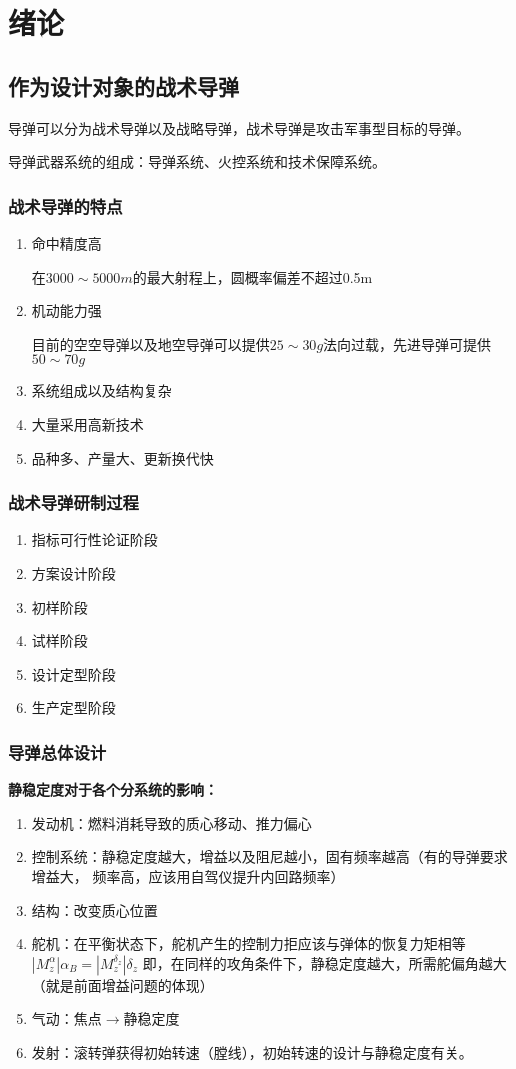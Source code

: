 \chapter{绪论}
\section{作为设计对象的战术导弹}

导弹可以分为战术导弹以及战略导弹，战术导弹是攻击军事型目标的导弹。

导弹武器系统的组成：导弹系统、火控系统和技术保障系统。
\subsection{战术导弹的特点}
\begin{enumerate}[1)]
    \item 命中精度高
    
    {\kaishu 在$3000\sim5000m$的最大射程上，圆概率偏差不超过0.5m}
    \item 机动能力强
    
    {\kaishu 目前的空空导弹以及地空导弹可以提供$25\sim30g$法向过载，先进导弹可提供$50\sim70g$}
    \item 系统组成以及结构复杂
    \item 大量采用高新技术
    \item 品种多、产量大、更新换代快
\end{enumerate}
\subsection{战术导弹研制过程}
\begin{enumerate}[1)]
    \item 指标可行性论证阶段
    \item 方案设计阶段
    \item 初样阶段
    \item 试样阶段
    \item 设计定型阶段
    \item 生产定型阶段
\end{enumerate}
\subsection{导弹总体设计}
\textbf{静稳定度对于各个分系统的影响：}
\begin{enumerate}[1)]
    \item 发动机：燃料消耗导致的质心移动、推力偏心
    \item 控制系统：静稳定度越大，增益以及阻尼越小，固有频率越高（有的导弹要求增益大，
    频率高，应该用自驾仪提升内回路频率）
    \item 结构：改变质心位置
    \item 舵机：在平衡状态下，舵机产生的控制力拒应该与弹体的恢复力矩相等
    $\left|M^{\alpha}_z\right|\alpha_B = \left|M^{\delta_z}_z\right|\delta_z$ 
    即，在同样的攻角条件下，静稳定度越大，所需舵偏角越大（就是前面增益问题的体现）
    \item 气动：焦点$\rightarrow$静稳定度
    \item 发射：滚转弹获得初始转速（膛线），初始转速的设计与静稳定度有关。
\end{enumerate}
